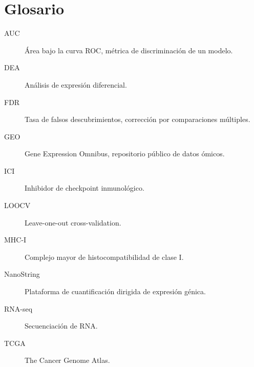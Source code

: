 \chapter{Glosario}

\begin{description}
    \item[AUC] Área bajo la curva ROC, métrica de discriminación de un modelo.
    \item[DEA] Análisis de expresión diferencial.
    \item[FDR] Tasa de falsos descubrimientos, corrección por comparaciones múltiples.
    \item[GEO] Gene Expression Omnibus, repositorio público de datos ómicos.
    \item[ICI] Inhibidor de checkpoint inmunológico.
    \item[LOOCV] Leave-one-out cross-validation.
    \item[MHC-I] Complejo mayor de histocompatibilidad de clase I.
    \item[NanoString] Plataforma de cuantificación dirigida de expresión génica.
    \item[RNA-seq] Secuenciación de RNA.
    \item[TCGA] The Cancer Genome Atlas.
\end{description}

